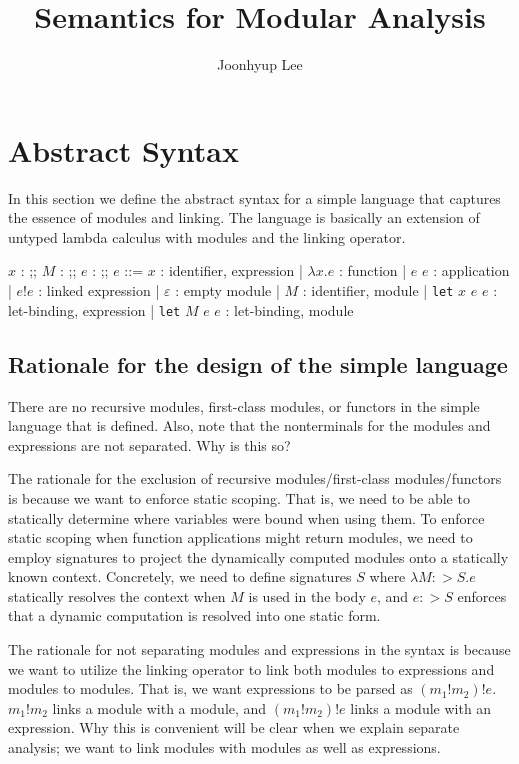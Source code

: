 \documentclass{article}
\title{Semantics for Modular Analysis}
\author{Joonhyup Lee}
\date{}
\newcommand*{\Expr}{\text{Expr}}
\newcommand*{\ExprVar}{\text{ExprVar}}
\newcommand*{\ModVar}{\text{ModVar}}
\newcommand*{\link}[2]{{#1}\mathtt{!}{#2}}
\begin{document}
\maketitle

\section{Abstract Syntax}

In this section we define the abstract syntax for a simple language that captures the essence of modules and linking.
The language is basically an extension of untyped lambda calculus with modules and the linking operator.

\begin{bnfgrammar}
  $x$ : \in \ExprVar
  ;;
  $M$ : \in \ModVar
  ;;
  $e$ : \in \Expr
  ;;
  $e$ ::= $x$ : identifier, expression
  | $\lambda x.e$ : function
  | $e$ $e$ : application
  | $\link{e}{e}$ : linked expression
  | $\varepsilon$ : empty module
  | $M$ : identifier, module
  | \texttt{let} $x$ $e$ $e$ : let-binding, expression
  | \texttt{let} $M$ $e$ $e$ : let-binding, module
\end{bnfgrammar}

\subsection{Rationale for the design of the simple language}

There are no recursive modules, first-class modules, or functors in the simple language that is defined.
Also, note that the nonterminals for the modules and expressions are not separated. Why is this so?

The rationale for the exclusion of recursive modules/first-class modules/functors is because we want to enforce static scoping.
That is, we need to be able to statically determine where variables were bound when using them.
To enforce static scoping when function applications might return modules, we need to employ signatures to project the dynamically computed modules onto a statically known context.
Concretely, we need to define signatures $S$ where $\lambda M:>S.e$ statically resolves the context when $M$ is used in the body $e$, and $e:>S$ enforces that a dynamic computation is resolved into one static form.

The rationale for not separating modules and expressions in the syntax is because we want to utilize the linking operator to link both modules to expressions and modules to modules.
That is, we want expressions to be parsed as $(m_1!m_2)!e$.
$\link{m_1}{m_2}$ links a module with a module, and $(m_1!m_2)!e$ links a module with an expression.
Why this is convenient will be clear when we explain separate analysis; we want to link modules with modules as well as expressions.
\end{document}
